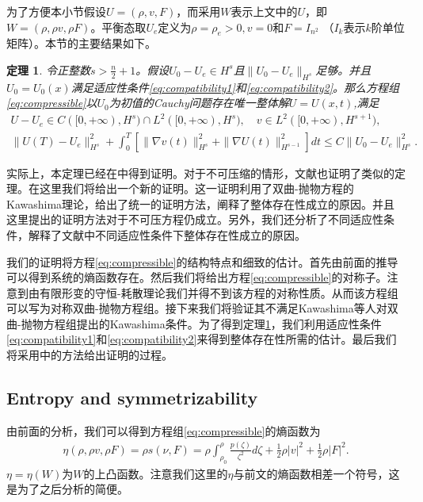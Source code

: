 \documentclass{article}
\newtheorem{theorem}{定理}
\begin{document}
为了方便本小节假设$U = (\rho, v ,F)$，而采用$W$表示上文中的$U$，即$W=(\rho, \rho v ,\rho F)$。平衡态取$U_e$定义为$\rho=\rho_e>0,  v =0 $和$F=I_{n^2}$ （$I_k$表示$k$阶单位矩阵）。本节的主要结果如下。
\begin{theorem}\label{theoremcom}
令正整数$s > \frac{n}{2}+1$。假设$U_0-U_e\in H^s$且$\|U_0-U_e\|_{H^s}$足够。并且$U_0 = U_0(x)$满足适应性条件\eqref{eq:compatibility1}和\eqref{eq:compatibility2}。那么方程组\eqref{eq:compressible}以$U_0$为初值的Cauchy问题存在唯一整体解$U=U(x,t)$,满足
    \begin{eqnarray}\label{eq:thmincom}
       U - U_e\in C([0,+\infty), H^s) \cap L^2([0,+\infty), H^{s}), \nonumber \quad
         v \in L^2([0,+\infty), H^{s+1}),\\[2mm]
      \|U(T)-U_e\|_{H^s}^2 +  \int_0^T \left[\|\nabla  v (t) \|_{H^s}^2 + \|\nabla U(t)\|_{H^{s-1}}^2\right] dt
      \le C \|U_0-U_e\|_{H^s}^2 .
    \end{eqnarray}
\end{theorem}

实际上，本定理已经在\cite{qian2010global,hu2011global}中得到证明。对于不可压缩的情形，文献\cite{lin2005hydrodynamics,lei2008global,chen2006global}也证明了类似的定理。在这里我们将给出一个新的证明。这一证明利用了双曲-抛物方程的Kawashima理论，给出了统一的证明方法，阐释了整体存在性成立的原因。并且这里提出的证明方法对于不可压方程仍成立。另外，我们还分析了不同适应性条件，解释了文献\cite{lin2005hydrodynamics,lei2008global,chen2006global,qian2010global,hu2011global}中不同适应性条件下整体存在性成立的原因。

我们的证明将方程\eqref{eq:compressible}的结构特点和细致的估计。首先由前面的推导可以得到系统的熵函数存在。然后我们将给出方程\eqref{eq:compressible}的对称子。注意到由有限形变的守恒-耗散理论我们并得不到该方程的对称性质。从而该方程组可以写为对称双曲-抛物方程组。接下来我们将验证其不满足Kawashima等人对双曲-抛物方程组提出的Kawashima条件。为了得到定理\ref{theoremcom}，我们利用适应性条件\eqref{eq:compatibility1}和\eqref{eq:compatibility2}来得到整体存在性所需的估计。最后我们将采用\cite{kawashima1984systems,yong2004entropy}中的方法给出证明的过程。

\subsection{Entropy and symmetrizability}
由前面的分析，我们可以得到方程组\eqref{eq:compressible}的熵函数为
\begin{eqnarray}\label{22}
  \eta(\rho,\rho  v ,\rho F) = \rho s(\nu,F) =  \rho \int_{\rho_0}^\rho \frac{p(\zeta)}{\zeta^2} d\zeta + \frac{1}{2} \rho | v |^2 + \frac{1}{2} \rho |F|^2.
\end{eqnarray}
$\eta = \eta(W)$为$W$的上凸函数。注意我们这里的$\eta$与前文的熵函数相差一个符号，这是为了之后分析的简便。
\end{document}
